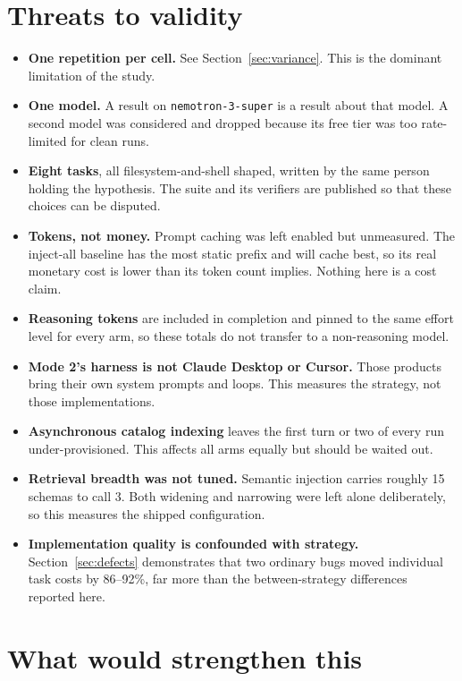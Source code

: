 \documentclass[11pt,a4paper]{article}
\begin{document}
\section{Threats to validity}

\begin{itemize}[leftmargin=1.4em, itemsep=0.3em]
  \item \textbf{One repetition per cell.} See Section~\ref{sec:variance}. This is the dominant
  limitation of the study.
  \item \textbf{One model.} A result on \texttt{nemotron-3-super} is a result about that model. A
  second model was considered and dropped because its free tier was too rate-limited for clean runs.
  \item \textbf{Eight tasks}, all filesystem-and-shell shaped, written by the same person holding the
  hypothesis. The suite and its verifiers are published so that these choices can be disputed.
  \item \textbf{Tokens, not money.} Prompt caching was left enabled but unmeasured. The inject-all
  baseline has the most static prefix and will cache best, so its real monetary cost is lower than
  its token count implies. Nothing here is a cost claim.
  \item \textbf{Reasoning tokens} are included in completion and pinned to the same effort level for
  every arm, so these totals do not transfer to a non-reasoning model.
  \item \textbf{Mode 2's harness is not Claude Desktop or Cursor.} Those products bring their own
  system prompts and loops. This measures the strategy, not those implementations.
  \item \textbf{Asynchronous catalog indexing} leaves the first turn or two of every run
  under-provisioned. This affects all arms equally but should be waited out.
  \item \textbf{Retrieval breadth was not tuned.} Semantic injection carries roughly 15 schemas to
  call 3. Both widening and narrowing were left alone deliberately, so this measures the shipped
  configuration.
  \item \textbf{Implementation quality is confounded with strategy.} Section~\ref{sec:defects}
  demonstrates that two ordinary bugs moved individual task costs by 86--92\%, far more than the
  between-strategy differences reported here.
\end{itemize}

\section{What would strengthen this}
\end{document}
